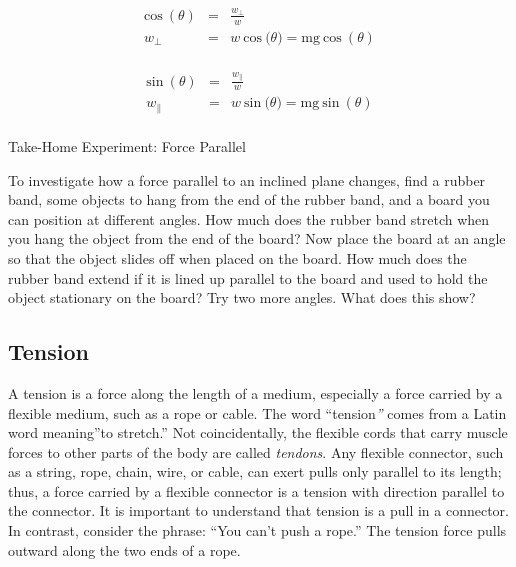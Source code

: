 \documentclass[
]{book}
\begin{document}
\leavevmode{}%
\[\begin{array}{lll}
{\text{cos}\ (\theta)} & = & \frac{w_{\bot}}{w} \\
w_{\bot} & = & {w\ \text{cos}\ (\theta{) = {\text{mg}\ }}\text{cos}\ (\theta)} \\
\end{array}{}\]

\leavevmode{}%
\[\begin{array}{lll}
{\text{sin}\ (\theta)} & = & \frac{w_{\parallel}}{w} \\
w_{\parallel} & = & {w\ \text{sin}\ (\theta{) = {\text{mg}\ }}\text{sin}\ (\theta)} \\
\end{array}{}\]

\hypertarget{fs-id2378314}{}
Take-Home Experiment: Force Parallel

To investigate how a force parallel to an inclined plane changes, find a
rubber band, some objects to hang from the end of the rubber band, and a
board you can position at different angles. How much does the rubber
band stretch when you hang the object from the end of the board? Now
place the board at an angle so that the object slides off when placed on
the board. How much does the rubber band extend if it is lined up
parallel to the board and used to hold the object stationary on the
board? Try two more angles. What does this show?

\hypertarget{fs-id1477607}{}
\hypertarget{tension}{%
\subsection{Tension}\label{tension}}

A \protect\hypertarget{import-auto-id1608257}{}{tension}\textbf{} is a force along the
length of a medium, especially a force carried by a flexible medium,
such as a rope or cable. The word ``tension\emph{''} comes from a Latin word
meaning''to stretch.'' Not coincidentally, the flexible cords that carry
muscle forces to other parts of the body are called \emph{tendons}. Any
flexible connector, such as a string, rope, chain, wire, or cable, can
exert pulls only parallel to its length; thus, a force carried by a
flexible connector is a tension with direction parallel to the
connector. It is important to understand that tension is a pull in a
connector. In contrast, consider the phrase: ``You can't push a rope.''
The tension force pulls outward along the two ends of a rope.
\end{document}

